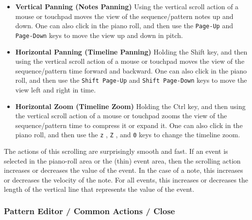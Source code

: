    \begin{itemize}
      \item \textbf{Vertical Panning (Notes Panning)}
         Using the vertical scroll action of a mouse or touchpad moves the
         view of the sequence/pattern notes up and down.
         One can also click in the piano roll, and then use the
         \texttt{Page-Up} 
         and \texttt{Page-Down} 
         keys to move the view up and down in pitch.
      \item \textbf{Horizontal Panning (Timeline Panning)}
         Holding the Shift key, and then using the vertical scroll action of a
         mouse or touchpad moves the view of the sequence/pattern time forward
         and backward.
         One can also click in the piano roll, and then use the
         \texttt{Shift Page-Up} 
         and \texttt{Shift Page-Down} 
         keys to move the view left and right in time.
      \item \textbf{Horizontal Zoom (Timeline Zoom)}
         Holding the Ctrl key, and then using the vertical scroll action of a
         mouse or touchpad zooms the view of the sequence/pattern time to
         compress it or expand it.
         One can also click in the piano roll, and then use the
         \texttt{z} ,
         \texttt{Z} , and
         \texttt{0}  keys to change the timeline zoom.
   \end{itemize}

   The actions of this scrolling are surprisingly smooth and fast.
   If an event is selected in the piano-roll area or the (thin) event area,
   then the scrolling action increases or decreases the value of the event.
   In the case of a note, this increases or decreases the velocity of the note.
   For all events, this increases or decreases the length of the vertical line
   that represents the value of the event.

\subsubsection{Pattern Editor / Common Actions / Close}
\label{subsec:seq64_pattern_editor_close}

